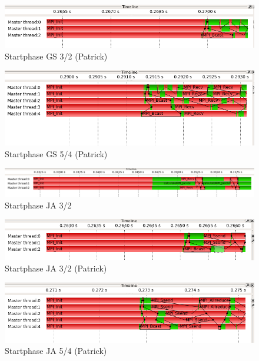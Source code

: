 \documentclass[a4paper,10pt]{article}
\begin{document}
\begin{figure}[h!]
  \caption{Startphase GS 3/2 (Patrick)}
  \includegraphics[width=14cm]{Patrick/c_start_GS_3x2.png}
\end{figure}
\begin{figure}[h!]
  \caption{Startphase GS 5/4 (Patrick)}
  \includegraphics[width=14cm]{Patrick/c_start_GS_5x4.png}
\end{figure}
\begin{figure}[h!]
  \caption{Startphase JA 3/2}
  \includegraphics[width=14cm]{c_start_JA_3x2.png}
\end{figure}
\begin{figure}[h!]
  \caption{Startphase JA 3/2 (Patrick)}
  \includegraphics[width=14cm]{Patrick/c_start_JA_3x2.png}
\end{figure}
\begin{figure}[h!]
  \caption{Startphase JA 5/4 (Patrick)}
  \includegraphics[width=14cm]{Patrick/c_start_JA_5x4.png}
\end{figure}
\end{document}
